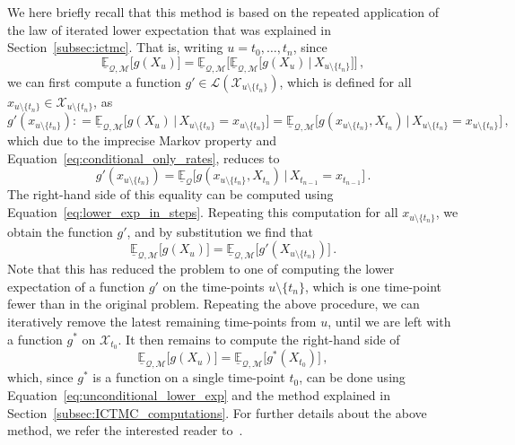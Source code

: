\documentclass[3p]{elsarticle}
\newcommand{\states}{\mathcal{X}}
\newcommand{\gambles}{\mathcal{L}}
\newcommand{\rateset}{\mathcal{Q}}
\newcommand{\coloneqq}{:\!=}
\begin{document}
We here briefly recall that this method is based on the repeated application of the law of iterated lower expectation that was explained in Section~\ref{subsec:ictmc}. That is, writing $u=t_0,\ldots,t_n$, since
\begin{equation*}
\underline{\mathbb{E}}_{\rateset,\mathcal{M}}\bigl[g(X_u)\bigr] = \underline{\mathbb{E}}_{\rateset,\mathcal{M}}\biggl[\underline{\mathbb{E}}_{\rateset,\mathcal{M}}\bigl[g(X_u)\,\vert\,X_{u\setminus \{t_n\}}\bigr]\biggr]\,,
\end{equation*}
we can first compute a function $g'\in\gambles(\states_{u\setminus\{t_n\}})$, which is defined for all $x_{u\setminus\{t_n\}}\in\states_{u\setminus\{t_n\}}$, as
\begin{equation*}
g'\left(x_{u\setminus\{t_n\}}\right) \coloneqq \underline{\mathbb{E}}_{\rateset,\mathcal{M}}\bigl[g(X_u)\,\vert\,X_{u\setminus \{t_n\}}=x_{u\setminus\{t_n\}}\bigr] = \underline{\mathbb{E}}_{\rateset,\mathcal{M}}\bigl[g(x_{u\setminus \{t_n\}},X_{t_n})\,\vert\,X_{u\setminus \{t_n\}}=x_{u\setminus\{t_n\}}\bigr]\,,
\end{equation*}
which due to the imprecise Markov property and Equation~\eqref{eq:conditional_only_rates}, reduces to
\begin{equation}\label{eq:loile_inner_general}
g'\left(x_{u\setminus\{t_n\}}\right) = 
\underline{\mathbb{E}}_{\rateset}\bigl[ g(x_{u\setminus \{t_n\}},X_{t_n})\,\vert\, X_{t_{n-1}}=x_{t_{n-1}} \bigr]\,.
\end{equation}
The right-hand side of this equality can be computed using Equation~\eqref{eq:lower_exp_in_steps}. Repeating this computation for all $x_{u\setminus\{t_n\}}$, we obtain the function $g'$, and by substitution we find that
\begin{equation*}
\underline{\mathbb{E}}_{\rateset,\mathcal{M}}\bigl[g(X_u)\bigr] = \underline{\mathbb{E}}_{\rateset,\mathcal{M}}\bigl[g'(X_{u\setminus \{t_n\}})\bigr]\,.
\end{equation*}
Note that this has reduced the problem to one of computing the lower expectation of a function $g'$ on the time-points $u\setminus\{t_n\}$, which is one time-point fewer than in the original problem. Repeating the above procedure, we can iteratively remove the latest remaining time-points from $u$, until we are left with a function $g^*$ on $\states_{t_0}$. It then remains to compute the right-hand side of
\begin{equation*}
\underline{\mathbb{E}}_{\rateset,\mathcal{M}}\bigl[g(X_u)\bigr] = \underline{\mathbb{E}}_{\rateset,\mathcal{M}}\bigl[g^*(X_{t_0})\bigr]\,,
\end{equation*}
which, since $g^*$ is a function on a single time-point $t_0$, can be done using Equation~\eqref{eq:unconditional_lower_exp} and the method explained in Section~\ref{subsec:ICTMC_computations}. For further details about the above method, we refer the interested reader to~\cite[Section 9.2]{krak2016ictmc}.
\end{document}

